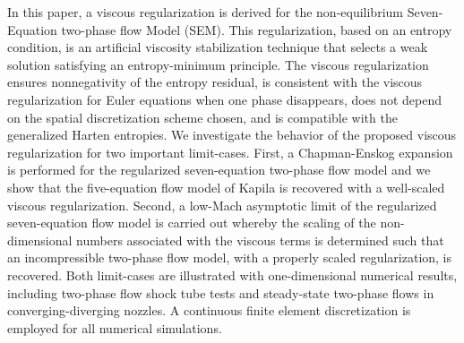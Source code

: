 In this paper, a viscous regularization is derived for the non-equilibrium Seven-Equation two-phase flow Model (SEM). 
This regularization, based on an entropy condition, is an artificial viscosity stabilization technique
that selects a weak solution satisfying an entropy-minimum principle.
The viscous regularization ensures nonnegativity of the entropy residual,
is consistent with the viscous regularization for Euler equations when one phase disappears, 
does not depend on the spatial discretization scheme chosen, 
and is compatible with the generalized Harten entropies. 
%
We investigate the behavior of the proposed viscous regularization for two important limit-cases. 
First, a Chapman-Enskog expansion is performed for the regularized seven-equation two-phase flow model and 
we show that the five-equation flow  model of Kapila is recovered with a well-scaled viscous regularization. 
Second, a low-Mach asymptotic limit of the regularized seven-equation flow model is carried out whereby the 
scaling of the non-dimensional numbers associated with the viscous terms is determined such that an 
incompressible two-phase flow model, with a properly scaled regularization, is recovered. 
%
Both limit-cases are illustrated with one-dimensional numerical results, including two-phase flow shock tube tests 
and steady-state two-phase flows in converging-diverging nozzles.
A continuous finite element discretization is employed for all numerical simulations.
